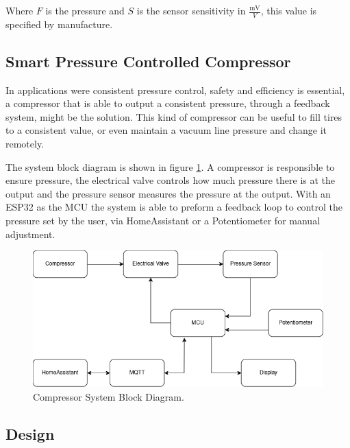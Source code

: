 Where $F$ is the pressure and $S$ is the sensor sensitivity in $\frac{\si{\m\V}}{\si{V}}$, this value is specified by manufacture.

\subsection{Smart Pressure Controlled Compressor}

In applications were consistent pressure control, safety and efficiency is essential, a compressor that is able to output a consistent pressure, through a feedback system, might be the solution. This kind of compressor can be useful to fill tires to a consistent value, or even maintain a vacuum line pressure and change it remotely. 

The system block diagram is shown in figure \ref{fig:BlockDiagramP6}. A compressor is responsible to ensure pressure, the electrical valve controls how much pressure there is at the output and the pressure sensor measures the pressure at the output. With an ESP32 as the MCU the system is able to preform a feedback loop to control the pressure set by the user, via HomeAssistant or a Potentiometer for manual adjustment.

\begin{figure}[H]
    \centering
    \includegraphics*[scale = 0.5]{Images/P6Block.png}
    \caption{Compressor System Block Diagram.}
    \label{fig:BlockDiagramP6}
\end{figure}

\subsection{Design}


